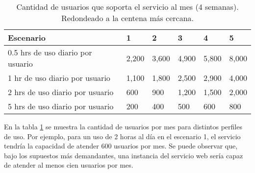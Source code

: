 \begin{table}[!ht]
    \centering
    \caption{ Cantidad de usuarios que soporta el servicio al mes (4 semanas).
        Redondeado a la centena más cercana. }
    \begin{tabular}{|l|l|l|l|l|l|}
    \hline
        Escenario & 1 & 2 & 3 & 4 & 5 \\ \hline
        0.5 hrs de uso diario por usuario & 2,200 & 3,600 & 4,900 & 5,800 & 8,000 \\ \hline
          1 hr  de uso diario por usuario & 1,100 & 1,800 & 2,500 & 2,900 & 4,000 \\ \hline
          2 hrs de uso diario por usuario & 600   & 900   & 1,200 & 1,500 & 2,000 \\ \hline
          5 hrs de uso diario por usuario & 200   & 400   & 500   & 600   & 800   \\ \hline
    \end{tabular}
    \label{CPCU}
\end{table}

En la tabla \ref{CPCU} se muestra la cantidad de usuarios por mes para distintos
perfiles de uso. Por ejemplo, para un uso de 2 horas al día en el escenario 1,
el servicio tendría la capacidad de atender 600 usuarios por mes. Se puede
observar que, bajo los supuestos más demandantes, una instancia del servicio web
sería capaz de atender al menos cien usuarios por mes.
